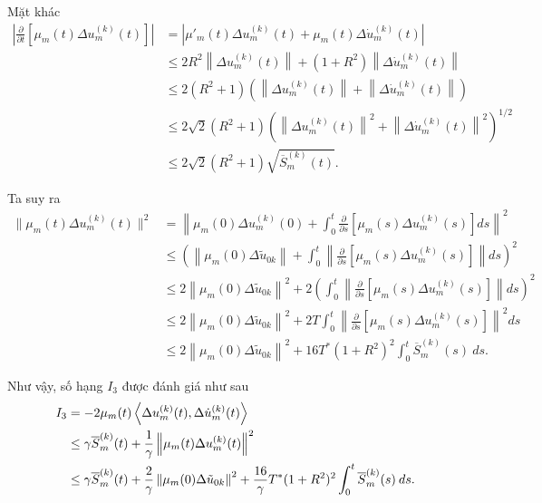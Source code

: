 \documentclass[12pt,a4paper]{article}
\theoremstyle{definition}
\theoremstyle{definition}
\begin{document}
Mặt khác
\begin{align*}
    \left|\frac{\partial}{\partial t} \left[\mu_m(t) \Delta u_m^{(k)}(t)\right]\right|
    &= \left|\mu'_m(t) \Delta u_m^{(k)}(t) + \mu_m(t) \Delta \dot{u}_m^{(k)}(t)\right| \\
    &\le 2 R^2 \left\|\Delta u_m^{(k)}(t)\right\| + (1 + R^2) \left\|\Delta \dot{u}_m^{(k)}(t)\right\| \\
    &\le 2(R^2 + 1) \left(\left\|\Delta u_m^{(k)}(t)\right\| + \left\|\Delta \dot{u}_m^{(k)}(t)\right\|\right) \\
    &\le 2\sqrt{2} (R^2 + 1) \left(\left\|\Delta u_m^{(k)}(t)\right\|^2 + \left\|\Delta \dot{u}_m^{(k)}(t)\right\|^2\right)^{1/2} \\
    &\le 2\sqrt{2} (R^2 + 1) \sqrt{\overline{S}_m^{(k)}(t)}.
\end{align*}

Ta suy ra
\begin{align*}
    \|\mu_m(t) \Delta u_m^{(k)}(t) \|^2
    &= \left\| \mu_m(0) \Delta u_m^{(k)}(0) + \int_0^t \frac{\partial}{\partial s} \left[\mu_m(s) \Delta u_m^{(k)}(s)\right] ds \right\|^2 \\
    &\le \left(\left\|\mu_m(0) \Delta \tilde{u}_{0k}\right\| + \int_0^t \left\|\frac{\partial}{\partial s} \left[\mu_m(s) \Delta u_m^{(k)}(s)\right]\right\| ds\right)^2 \\
    &\le 2 \left\|\mu_m(0) \Delta \tilde{u}_{0k}\right\|^2 + 2 \left(\int_0^t \left\|\frac{\partial}{\partial s} \left[\mu_m(s) \Delta u_m^{(k)}(s)\right]\right\| ds\right)^2 \\
    &\le 2 \left\|\mu_m(0) \Delta \tilde{u}_{0k}\right\|^2 + 2T \int_0^t \left\|\frac{\partial}{\partial s} \left[\mu_m(s) \Delta u_m^{(k)}(s)\right]\right\|^2 ds \\
    &\le 2 \left\|\mu_m(0) \Delta \tilde{u}_{0k}\right\|^2 + 16T^* (1 + R^2)^2 \int_0^t \overline{S}_m^{(k)}(s)\: ds.
\end{align*}

Như vậy, số hạng $I_3$ được đánh giá như sau
\begin{align}
    I_3 &= - 2 \mu_m(t) \left<\Delta u_m^{(k)}(t), \Delta \dot{u}_m^{(k)}(t)\right> \\
    &\le \gamma \overline{S}_m^{(k)}(t) + \frac{1}{\gamma} \left\|\mu_m(t) \Delta u_m^{(k)}(t)\right\|^2 \notag \\
    &\le \gamma \overline{S}_m^{(k)}(t) + \frac{2}{\gamma} \left\|\mu_m(0) \Delta \tilde{u}_{0k}\right\|^2 + \frac{16}{\gamma} T^* (1 + R^2)^2 \int_0^t \overline{S}_m^{(k)}(s)\: ds. \notag 
\end{align}
\end{document}
